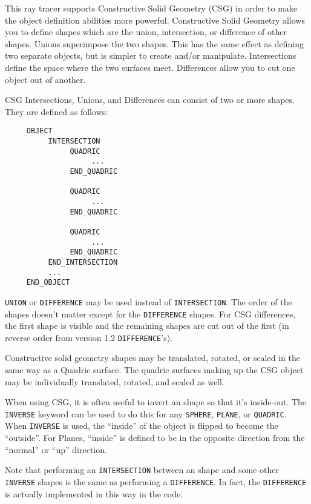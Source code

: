 This ray tracer supports Constructive Solid Geometry (CSG) in order to
make the object definition abilities more powerful.  Constructive
Solid Geometry allows you to define shapes which are the union,
intersection, or difference of other shapes.  Unions superimpose the
two shapes.  This has the same effect as defining two separate
objects, but is simpler to create and/or manipulate.  Intersections
define the space where the two surfaces meet.  Differences allow you
to cut one object out of another.

CSG Intersections, Unions, and Differences can consist of two or more
shapes.
They are defined as follows:
\begin{verbatim}
     OBJECT
          INTERSECTION
               QUADRIC
                    ...
               END_QUADRIC

               QUADRIC
                    ...
               END_QUADRIC

               QUADRIC
                    ...
               END_QUADRIC
          END_INTERSECTION
          ...
     END_OBJECT
\end{verbatim}
{\tt UNION} or {\tt DIFFERENCE} may be used instead of
{\tt INTERSECTION}.  The order of the shapes doesn't matter except for the
{\tt DIFFERENCE} shapes.  For CSG differences, the first shape is
visible and the remaining shapes are cut out of the first (in reverse
order from version 1.2 {\tt DIFFERENCE}'s).

Constructive solid geometry shapes may be translated, rotated, or scaled in
the same way as a Quadric surface.  The quadric surfaces making up the CSG
object may be individually translated, rotated, and scaled as
well.

When using CSG, it is often useful to invert an shape so that it's
inside-out.  The {\tt INVERSE} keyword can be
used to do this for any
{\tt SPHERE}, {\tt PLANE}, or {\tt QUADRIC}.  When {\tt INVERSE} is
used, the ``inside'' of the object is flipped to become the
``outside''.  For Planes, ``inside'' is
defined to be in the opposite direction from the ``normal'' or ``up''
direction.

Note that performing an {\tt INTERSECTION} between an shape and some
other {\tt INVERSE} shapes is the same as performing a
{\tt DIFFERENCE}.  In fact, the {\tt DIFFERENCE} is actually implemented in
this way in the code.

